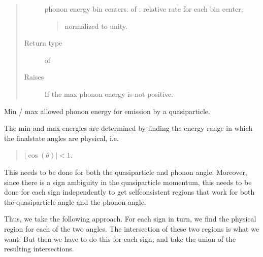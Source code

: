 \documentclass[letterpaper,10pt,english]{sphinxmanual}
\begin{document}
\begin{fulllineitems}
\begin{fulllineitems}
\begin{quote}
\begin{description}
phonon energy bin centers.
 of : relative rate for each bin center,
\begin{quote}

normalized to unity.
\end{quote}


\item[{Return type}] \leavevmode
{} of 

\item[{Raises}] \leavevmode
{} \textendash{} If the max phonon energy is not positive.

\end{description}\end{quote}

\end{fulllineitems}


\begin{fulllineitems}
\label{\detokenize{code_structure:scdc.interaction.QuasiparticlePhononEmission.phonon_energy_region}}
Min / max allowed phonon energy for emission by a quasiparticle.

The min and max energies are determined by finding the energy range
in which the final\sphinxhyphen{}state angles are physical, i.e.
\begin{quote}

\(|\cos(\theta)| < 1\).
\end{quote}

This needs to be done for both the quasiparticle and phonon angle.
Moreover, since there is a sign ambiguity in the quasiparticle
momentum, this needs to be done for each sign independently to get
self\sphinxhyphen{}consistent regions that work for both the quasiparticle angle and
the phonon angle.

Thus, we take the following approach. For each sign in turn, we find
the physical region for each of the two angles. The intersection of
these two regions is what we want. But then we have to do this for each
sign, and take the union of the resulting intersections.


\end{fulllineitems}
\end{fulllineitems}
\end{document}
